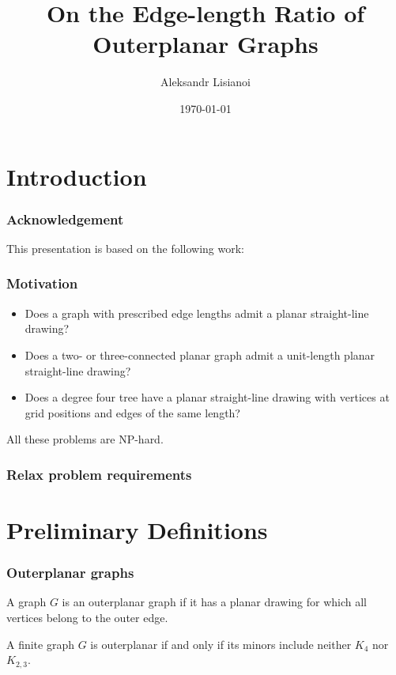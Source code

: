 \documentclass[xetex,mathserif,serif]{beamer}
\title{On the Edge-length Ratio of Outerplanar Graphs}
\author{Aleksandr Lisianoi}
\institute{Technische Universität Wien}
\date{\today}
\begin{document}
\maketitle

\section{Introduction}

\begin{frame}
  \frametitle{Acknowledgement}

  This presentation is based on the following work:

\end{frame}

\begin{frame}
  \frametitle{Motivation}

  \begin{itemize}
  \item Does a graph with prescribed edge lengths admit a planar straight-line drawing?
  \item Does a two- or three-connected planar graph admit a unit-length planar straight-line drawing?
  \item Does a degree four tree have a planar straight-line drawing with vertices at grid positions and edges of the same length?
  \end{itemize}

  \begin{center}
    All these problems are NP-hard.
    \end{center}

\end{frame}

\begin{frame}
  \frametitle{Relax problem requirements}
\end{frame}

\section{Preliminary Definitions}

\begin{frame}
  \frametitle{Outerplanar graphs}

    \begin{definition}
    A graph \(G\) is an outerplanar graph if it has a planar drawing for which all vertices belong to the outer edge.
  \end{definition}

  \begin{definition}
    A finite graph \(G\) is outerplanar if and only if its minors include neither \(K_4\) nor \(K_{2, 3}\).
  \end{definition}
\end{frame}
\end{document}
